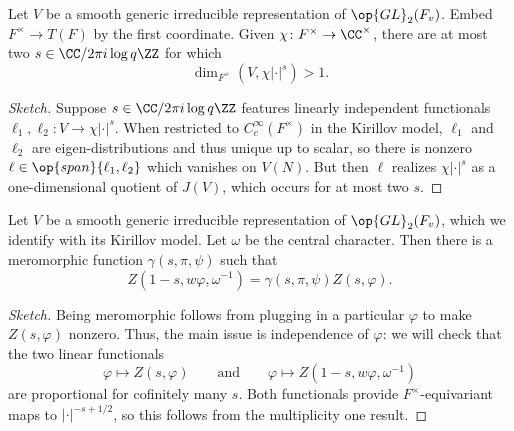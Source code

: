 \documentclass{article}
\begin{document}
\begin{lemma}
	Let $V$ be a smooth generic irreducible representation of $\op{GL}_2(F_v)$. Embed $F^\times\to T(F)$ by the first coordinate. Given $\chi\colon F^\times\to\CC^\times$, there are at most two $s\in\CC/2\pi i\log q\ZZ$ for which
	\[\dim_{F^\times}(V,\chi\left|\cdot\right|^s)>1.\]
\end{lemma}
\begin{proof}[Sketch]
	Suppose $s\in\CC/2\pi i\log q\ZZ$ features linearly independent functionals $\ell_1,\ell_2\colon V\to\chi\left|\cdot\right|^s$. When restricted to $C_c^\infty(F^\times)$ in the Kirillov model, $\ell_1$ and $\ell_2$ are eigen-distributions and thus unique up to scalar, so there is nonzero $\ell\in\op{span}\{\ell_1,\ell_2\}$ which vanishes on $V(N)$. But then $\ell$ realizes $\chi\left|\cdot\right|^s$ as a one-dimensional quotient of $J(V)$, which occurs for at most two $s$.
\end{proof}
\begin{theorem}
	Let $V$ be a smooth generic irreducible representation of $\op{GL}_2(F_v)$, which we identify with its Kirillov model. Let $\omega$ be the central character. Then there is a meromorphic function $\gamma(s,\pi,\psi)$ such that
	\[Z\left(1-s,w\varphi,\omega^{-1}\right)=\gamma(s,\pi,\psi)Z(s,\varphi).\]
\end{theorem}
\begin{proof}[Sketch]
	Being meromorphic follows from plugging in a particular $\varphi$ to make $Z(s,\varphi)$ nonzero. Thus, the main issue is independence of $\varphi$: we will check that the two linear functionals
	\[\varphi\mapsto Z(s,\varphi)\qquad\text{and}\qquad\varphi\mapsto Z\left(1-s,w\varphi,\omega^{-1}\right)\]
	are proportional for cofinitely many $s$. Both functionals provide $F^\times$-equivariant maps to $\left|\cdot\right|^{-s+1/2}$, so this follows from the multiplicity one result.
\end{proof}
\end{document}
